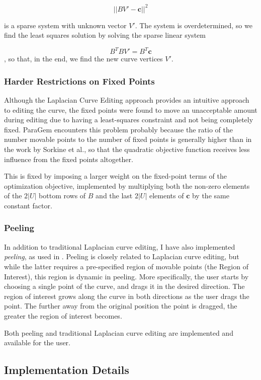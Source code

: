 \documentclass[english]{article}
\begin{document}
\[
||BV'- \mathbf{c}||^2
\]

is a sparse system with unknown vector $V'$. The system is overdetermined, so we find the least squares solution by solving the sparse linear system

\[
B^TBV' = B^T\mathbf{c}
\],
so that, in the end, we find the new curve vertices $V'$.

\subsubsection{Harder Restrictions on Fixed Points}

Although the Laplacian Curve Editing approach provides an intuitive approach to editing the curve, the fixed points were found to move an unacceptable amount during editing due to having a least-squares constraint and not being completely fixed. ParaGem encounters this problem probably because the ratio of the number movable points to the number of fixed points is generally higher than in the work by Sorkine et al., so that the quadratic objective function receives less influence from the fixed points altogether.

This is fixed by imposing a larger weight on the fixed-point terms of the optimization objective, implemented by multiplying both the non-zero elements of the $2|U|$ bottom rows of $B$ and the last $2|U|$ elements of $\mathbf{c}$ by the same constant factor.

\subsubsection{Peeling}

In addition to traditional Laplacian curve editing, I have also implemented \textit{peeling}, as used in \cite{gingold09}. Peeling is closely related to Laplacian curve editing, but while the latter requires a pre-specified region of movable points (the Region of Interest), this region is dynamic in peeling. More specifically, the user starts by choosing a single point of the curve, and drags it in the desired direction. The region of interest grows along the curve in both directions as the user drags the point. The further away from the original position the point is dragged, the greater the region of interest becomes.

Both peeling and traditional Laplacian curve editing are implemented and available for the user.

\subsection{Implementation Details}
\end{document}
